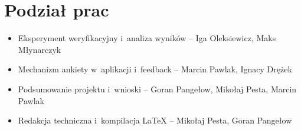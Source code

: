 \documentclass[14pt,a4paper]{extarticle}
\begin{document}
\section*{Podział prac}
\begin{itemize}
    \item Eksperyment weryfikacyjny i~analiza wyników -- Iga Oleksiewicz, Maks Młynarczyk
    \item Mechanizm ankiety w~aplikacji i~feedback -- Marcin Pawlak, Ignacy Drężek
    \item Podsumowanie projektu i~wnioski -- Goran Pangełow, Mikołaj Pesta, Marcin Pawlak
    \item Redakcja techniczna i~kompilacja \LaTeX{} -- Mikołaj Pesta, Goran Pangełow
\end{itemize}
\end{document}
